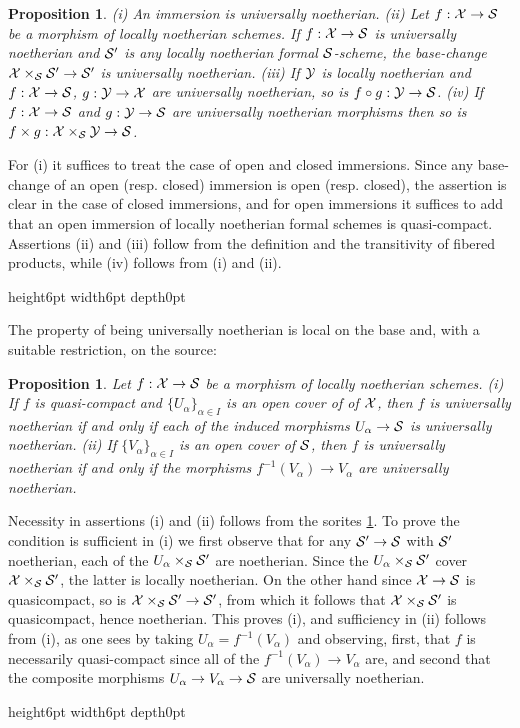 \documentclass{article}
\theoremstyle{change}
\newtheorem{prop}[subsubsection]{Proposition}
\numberwithin{equation}{subsubsection}
\newcommand{\demobox}{\vrule height6pt width6pt depth0pt}
\newenvironment{demo}{\noindent{\it Proof.}}
{{\unskip\nobreak\hfil\qquad
\demobox\parfillskip=0pt\par}
\medskip}
\begin{document}
\begin{prop}\label{prop:noeth-sorites}
  (i) An immersion is universally noetherian.  (ii)
  Let $f:{\cal X}\to{\cal S}$ be a morphism of locally noetherian schemes.
  If $f:{\cal X}\to{\cal S}$ is universally noetherian and ${\cal S}'$ is any locally
  noetherian formal ${\cal S}$-scheme, the base-change
  ${\cal X}\times_{\cal S}{\cal S}'\to{\cal S}'$ is universally noetherian. (iii) If ${\cal Y}$
  is locally noetherian and $f:{\cal X}\to{\cal S}$, $g:{\cal Y}\to{\cal X}$ are
  universally noetherian, so is $f\circ g:{\cal Y}\to{\cal S}$. (iv) If
  $f:{\cal X}\to{\cal S}$ and $g:{\cal Y}\to{\cal S}$ are universally noetherian morphisms
  then so is $f\times g:{\cal X}\times_{\cal S}{\cal Y}\to{\cal S}$.
\end{prop}
\begin{demo}
  For (i) it suffices to treat the case of open and closed
  immersions. Since any base-change of an open (resp. closed)
  immersion is open (resp. closed), the assertion is clear in the case
  of closed immersions, and for open immersions it suffices to add
  that an open immersion of locally noetherian formal schemes is
  quasi-compact.  Assertions (ii) and (iii) follow from the definition
  and the transitivity of fibered products, while (iv) follows from
  (i) and (ii).
\end{demo}

The property of being universally noetherian is local on the base and,
with a suitable restriction, on the source:

\begin{prop}\label{prop:properties-of-loc-noeth}
  Let $f:{\cal X}\to{\cal S}$ be a morphism of locally noetherian schemes.  (i)
  If $f$ is quasi-compact and $\{U_\alpha\}_{\alpha\in I}$ is an open
  cover of of ${\cal X}$, then $f$ is universally noetherian if and only if
  each of the induced morphisms $U_\alpha\to{\cal S}$ is universally
  noetherian. (ii) If $\{V_\alpha\}_{\alpha\in I}$ is an open cover of
  ${\cal S}$, then $f$ is universally noetherian if and only if the
  morphisms $f^{-1}(V_\alpha)\to V_\alpha$ are universally noetherian.
\end{prop}
\begin{demo}
  Necessity in assertions (i) and (ii) follows from the sorites
  \ref{prop:noeth-sorites}. To prove the condition is sufficient in
  (i) we first observe that for any ${\cal S}'\to{\cal S}$ with ${\cal S}'$
  noetherian, each of the $U_\alpha\times_{\cal S}{\cal S}'$ are
  noetherian. Since the $U_\alpha\times_{\cal S}{\cal S}'$ cover
  ${\cal X}\times_{\cal S}{\cal S}'$, the latter is locally noetherian. On the other
  hand since ${\cal X}\to{\cal S}$ is quasicompact, so is
  ${\cal X}\times_{\cal S}{\cal S}'\to{\cal S}'$, from which it follows that
  ${\cal X}\times_{\cal S}{\cal S}'$ is quasicompact, hence noetherian. This proves
  (i), and sufficiency in (ii) follows from (i), as one sees by taking
  $U_\alpha=f^{-1}(V_\alpha)$ and observing, first, that $f$ is
  necessarily quasi-compact since all of the
  $f^{-1}(V_\alpha)\to V_\alpha$ are, and second that the composite
  morphisms $U_\alpha\to V_\alpha\to{\cal S}$ are universally noetherian.
\end{demo}
\end{document}
